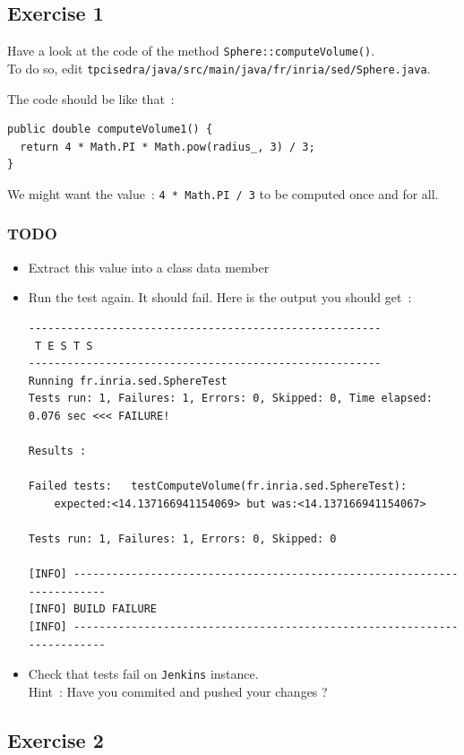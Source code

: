 \documentclass{article}
\begin{document}
\subsection{Exercise 1}

Have a look at the code of the method \texttt{Sphere::computeVolume()}.\\
To do so, edit \texttt{tpcisedra/java/src/main/java/fr/inria/sed/Sphere.java}.

The code should be like that~:
\begin{lstlisting}
public double computeVolume1() {
  return 4 * Math.PI * Math.pow(radius_, 3) / 3;
}
\end{lstlisting}


We might want the value~: \verb?4 * Math.PI / 3? to be computed once and for all.

\subsubsection{TODO}
\begin{itemize}
\item Extract this value into a class data member
\item Run the test again. It should fail.
Here is the output you should get~:
\begin{lstlisting}[breaklines=true]
-------------------------------------------------------
 T E S T S
-------------------------------------------------------
Running fr.inria.sed.SphereTest
Tests run: 1, Failures: 1, Errors: 0, Skipped: 0, Time elapsed: 0.076 sec <<< FAILURE!

Results :

Failed tests:   testComputeVolume(fr.inria.sed.SphereTest):
    expected:<14.137166941154069> but was:<14.137166941154067>

Tests run: 1, Failures: 1, Errors: 0, Skipped: 0

[INFO] ------------------------------------------------------------------------
[INFO] BUILD FAILURE
[INFO] ------------------------------------------------------------------------
\end{lstlisting}

\item Check that tests fail on \texttt{Jenkins} instance.\\
Hint~: Have you commited and pushed your changes ?
\end{itemize}

\subsection{Exercise 2}
\end{document}

